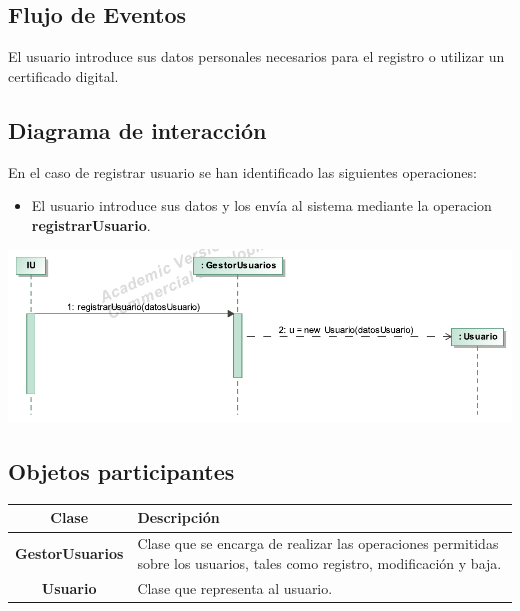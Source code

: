 \documentclass[12pt, a4paper, titlepage]{article}
\begin{document}
\subsection{Flujo de Eventos}
El usuario introduce sus datos personales necesarios para el registro o utilizar un certificado digital.

\subsection{Diagrama de interacción}

En el caso de {\sc registrar usuario } se han identificado las siguientes operaciones:

\begin{itemize}
	\item El usuario introduce sus datos y los envía al sistema mediante la operacion \textbf{registrarUsuario}.
\end{itemize}

\begin{center}
	\includegraphics{Imagenes/OperacionRegistrarUsuario.pdf}
\end{center}

\subsection{Objetos participantes}

\begin{center}

\begin{tabular}{|c|p{12cm}|}
	\hline
	\textbf{Clase} & \textbf{Descripción}\\ \hline
	\textbf{GestorUsuarios} &  Clase que se encarga de realizar las operaciones permitidas sobre los usuarios, tales como registro, modificación y baja.\\ \hline
	\textbf{Usuario} & Clase que representa al usuario. \\ \hline
\end{tabular}

\end{center}
\end{document}
